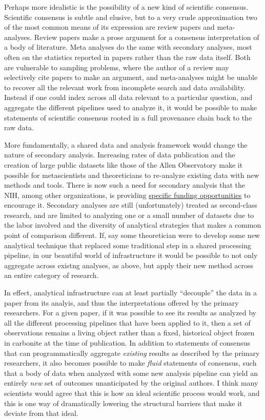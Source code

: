 \documentclass[10pt]{article}
\begin{document}
\begin{multicols}{2}
Perhaps more idealistic is the possibility of a new kind of scientific
consensus. Scientific consensus is subtle and elusive, but to a very
crude approximation two of the most common means of its expression are
review papers and meta-analyses. Review papers make a prose argument for
a consensus interpretation of a body of literature. Meta analyses do the
same with secondary analyses, most often on the statistics reported in
papers rather than the raw data itself. Both are vulnerable to sampling
problems, where the author of a review may selectively cite papers to
make an argument, and meta-analyses might be unable to recover all the
relevant work from incomplete search and data availability. Instead if
one could index across all data relevant to a particular question, and
aggregate the different pipelines used to analyze it, it would be
possible to make statements of scientific consensus rooted in a full
provenance chain back to the raw data.

More fundamentally, a shared data and analysis framework would change
the nature of secondary analysis. Increasing rates of data publication
and the creation of large public datasets like those of the Allen
Observatory make it possible for metascientists and theoreticians to
re-analyze existing data with new methods and tools. There is now such a
need for secondary analysis that the NIH, among other organizations, is
providing
\href{https://grants.nih.gov/grants/guide/rfa-files/rfa-mh-20-120.html}{specific
funding opportunities} to encourage it. Secondary analyses are still
(unfortunately) treated as second-class research, and are limited to
analyzing one or a small number of datasets due to the labor involved
and the diversity of analytical strategies that makes a common point of
comparison different. If, say some theoretician were to develop some new
analytical technique that replaced some traditional step in a shared
processing pipeline, in our beautiful world of infrastructure it would
be possible to not only aggregate across existng analyses, as above, but
apply their new method across an entire category of research.

In effect, analytical infrastructure can at least partially ``decouple''
the data in a paper from its analyis, and thus the interpretations
offered by the primary researchers. For a given paper, if it was
possible to see its results as analyzed by all the different processing
pipelines that have been applied to it, then a set of observations
remains a living object rather than a fixed, historical object frozen in
carbonite at the time of publication. In addition to statements of
consensus that can programmatically aggregate \emph{existing} results as
described by the primary researchers, it also becomes possible to make
\emph{fluid} statements of consensus, such that a body of data when
analyzed with some new analysis pipeline can yield an entirely
\emph{new} set of outcomes unanticipated by the original authors. I
think many scientists would agree that this is how an ideal scientific
process would work, and this is one way of dramatically lowering the
structural barriers that make it deviate from that ideal.


\end{multicols}
\end{document}
